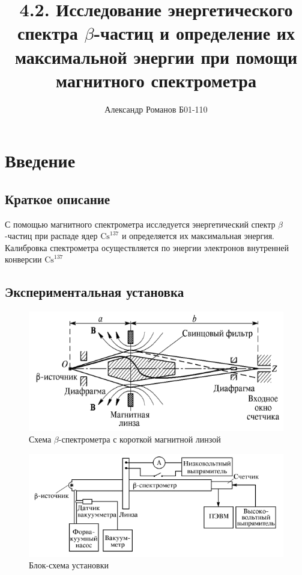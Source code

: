 \documentclass{article}
\author{Александр Романов Б01-110}
\date{}
\title{4.2. Исследование энергетического спектра \(\beta\)-частиц и определение их
максимальной энергии при помощи магнитного спектрометра}
\begin{document}
\maketitle
\section{Введение}
\subsection{Краткое описание}
С помощью магнитного спектрометра исследуется энергетический спектр \(\beta\)-частиц
при распаде ядер \(\text{Cs}^{137}\) и определяется их максимальная энергия. Калибровка
спектрометра осуществляется по энергии электронов внутренней конверсии \(\text{Cs}^{137}\)
\subsection{Экспериментальная установка}

\begin{figure}[H]
	\includegraphics[width=\textwidth]{scheme.png}
	\caption{Схема \(\beta\)-спектрометра с короткой магнитной линзой}
\end{figure}

\begin{figure}[H]
	\includegraphics[width=\textwidth]{scheme-2.png}
	\caption{Блок-схема установки}
\end{figure}
\end{document}
